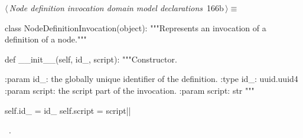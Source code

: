 \documentclass[%
    a4paper,    %
    justified,  %
    nobib,      %
    openany     %
]{tufte-book}
\begin{document}
\begin{flushleft} \small
\begin{minipage}{\linewidth}\label{scrap200}\raggedright\small
{} $\langle\,${\itshape Node definition invocation domain model declarations}\nobreak\ {\footnotesize {166b}}$\,\rangle\equiv$
\vspace{-1ex}
\begin{pythoncode}
class NodeDefinitionInvocation(object):
    """Represents an invocation of a definition of a node."""

    def __init__(self, id_, script):
        """Constructor.

        :param id_: the globally unique identifier of the definition.
        :type  id_: uuid.uuid4
        :param script: the script part of the invocation.
        :param script: str
        """

        self.id_ = id_
        self.script = script|\NWsep|
\end{pythoncode}
\vspace{1.5ex}
\footnotesize
\begin{list}{}{\setlength{\itemsep}{-\parsep}\setlength{\itemindent}{-\leftmargin}}
\item \NWtxtMacroRefIn\ .

\item{}
\end{list}
\end{minipage}\vspace{4ex}
\end{flushleft}
\end{document}

